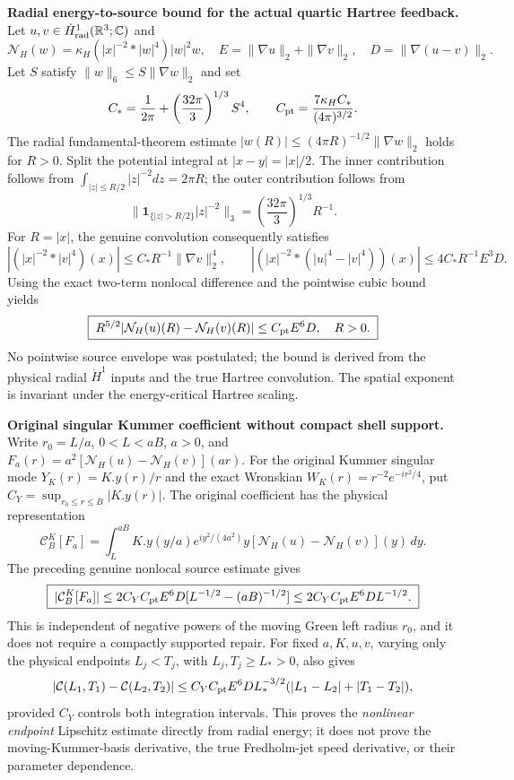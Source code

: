 \medskip
\noindent\textbf{Radial energy-to-source bound for the actual quartic Hartree feedback.}
Let $u,v\in\dot H^1_{\rm rad}(\mathbb R^3;\mathbb C)$ and
\[
 \mathcal N_H(w)=\kappa_H (|x|^{-2}*|w|^4)|w|^2w,\quad
 E=\|\nabla u\|_2+\|\nabla v\|_2,\quad
 D=\|\nabla(u-v)\|_2.
\]
Let $S$ satisfy $\|w\|_6\le S\|\nabla w\|_2$ and set
\[
 C_*=\frac1{2\pi}+
       \left(\frac{32\pi}{3}\right)^{1/3}S^4,\qquad
 C_{\rm pt}=\frac{7\kappa_H C_*}{(4\pi)^{3/2}}.
\]
The radial fundamental-theorem estimate
$|w(R)|\le(4\pi R)^{-1/2}\|\nabla w\|_2$
holds for $R>0$. Split the potential integral at
$|x-y|=|x|/2$. The inner contribution follows from
$\int_{|z|\le R/2}|z|^{-2}dz=2\pi R$; the outer contribution
follows from
\[
 \|\mathbf1_{\{|z|>R/2\}}|z|^{-2}\|_3
    =\left(\frac{32\pi}{3}\right)^{1/3}R^{-1}.
\]
For $R=|x|$, the genuine convolution consequently satisfies
\[
 |(|x|^{-2}*|v|^4)(x)|
       \le C_*R^{-1}\|\nabla v\|_2^4,\qquad
 |(|x|^{-2}*(|u|^4-|v|^4))(x)|
       \le4C_*R^{-1}E^3D.
\]
Using the exact two-term nonlocal difference and the pointwise
cubic bound yields
\[
 \boxed{\;
 R^{5/2}|\mathcal N_H(u)(R)-\mathcal N_H(v)(R)|
       \le C_{\rm pt}E^6D,\quad R>0.
 \;}
\]
No pointwise source envelope was postulated; the bound is derived
from the physical radial $\dot H^1$ inputs and the true Hartree
convolution. The spatial exponent is invariant under the energy-critical
Hartree scaling.

\medskip
\noindent\textbf{Original singular Kummer coefficient without compact shell support.}
Write $r_0=L/a$, $0<L<aB$, $a>0$, and
$F_a(r)=a^2[\mathcal N_H(u)-\mathcal N_H(v)](ar)$.
For the original Kummer singular mode $Y_K(r)=K.y(r)/r$
and the exact Wronskian $W_K(r)=r^{-2}e^{-ir^2/4}$,
put $C_Y=\sup_{r_0\le r\le B}|K.y(r)|$.
The original coefficient has the physical representation
\[
 \mathcal C_B^K[F_a]
 =\int_L^{aB}K.y(y/a)e^{iy^2/(4a^2)}
      y[\mathcal N_H(u)-\mathcal N_H(v)](y)\,dy.
\]
The preceding genuine nonlocal source estimate gives
\[
 \boxed{\;
 |\mathcal C_B^K[F_a]|
 \le2C_YC_{\rm pt}E^6D
       [L^{-1/2}-(aB)^{-1/2}]
 \le2C_YC_{\rm pt}E^6DL^{-1/2}.
 \;}
\]
This is independent of negative powers of the moving Green left
radius $r_0$, and it does not require a compactly supported repair.
For fixed $a,K,u,v$, varying only the physical endpoints
$L_j<T_j$, with $L_j,T_j\ge L_*>0$, also gives
\[
 |\mathcal C(L_1,T_1)-\mathcal C(L_2,T_2)|
 \le C_YC_{\rm pt}E^6D L_*^{-3/2}
 (|L_1-L_2|+|T_1-T_2|),
\]
provided $C_Y$ controls both integration intervals. This proves the
\emph{nonlinear endpoint} Lipschitz estimate directly from radial energy;
it does not prove the moving-Kummer-basis derivative, the true
Fredholm-jet speed derivative, or their parameter dependence.

